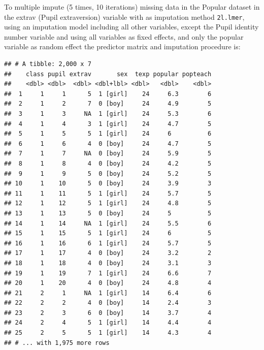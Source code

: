 \documentclass[
]{book}
\newenvironment{Shaded}{\begin{snugshade}}{\end{snugshade}}
\newcommand{\DataTypeTok}[1]{\textcolor[rgb]{0.13,0.29,0.53}{#1}}
\newcommand{\DecValTok}[1]{\textcolor[rgb]{0.00,0.00,0.81}{#1}}
\newcommand{\KeywordTok}[1]{\textcolor[rgb]{0.13,0.29,0.53}{\textbf{#1}}}
\newcommand{\NormalTok}[1]{#1}
\newcommand{\OperatorTok}[1]{\textcolor[rgb]{0.81,0.36,0.00}{\textbf{#1}}}
\newcommand{\StringTok}[1]{\textcolor[rgb]{0.31,0.60,0.02}{#1}}
\begin{document}
To multiple impute (5 times, 10 iterations) missing data in the Popular
dataset in the extrav (Pupil extraversion) variable with as imputation
method \texttt{2l.lmer}, using an imputation model including all other
variables, except the Pupil identity number variable and using all
variables as fixed effects, and only the popular variable as random
effect the predictor matrix and imputation procedure is:

\begin{Shaded}
\end{Shaded}

\begin{verbatim}
## # A tibble: 2,000 x 7
##    class pupil extrav       sex  texp popular popteach
##    <dbl> <dbl>  <dbl> <dbl+lbl> <dbl>   <dbl>    <dbl>
##  1     1     1      5  1 [girl]    24     6.3        6
##  2     1     2      7  0 [boy]     24     4.9        5
##  3     1     3     NA  1 [girl]    24     5.3        6
##  4     1     4      3  1 [girl]    24     4.7        5
##  5     1     5      5  1 [girl]    24     6          6
##  6     1     6      4  0 [boy]     24     4.7        5
##  7     1     7     NA  0 [boy]     24     5.9        5
##  8     1     8      4  0 [boy]     24     4.2        5
##  9     1     9      5  0 [boy]     24     5.2        5
## 10     1    10      5  0 [boy]     24     3.9        3
## 11     1    11      5  1 [girl]    24     5.7        5
## 12     1    12      5  1 [girl]    24     4.8        5
## 13     1    13      5  0 [boy]     24     5          5
## 14     1    14     NA  1 [girl]    24     5.5        6
## 15     1    15      5  1 [girl]    24     6          5
## 16     1    16      6  1 [girl]    24     5.7        5
## 17     1    17      4  0 [boy]     24     3.2        2
## 18     1    18      4  0 [boy]     24     3.1        3
## 19     1    19      7  1 [girl]    24     6.6        7
## 20     1    20      4  0 [boy]     24     4.8        4
## 21     2     1     NA  1 [girl]    14     6.4        6
## 22     2     2      4  0 [boy]     14     2.4        3
## 23     2     3      6  0 [boy]     14     3.7        4
## 24     2     4      5  1 [girl]    14     4.4        4
## 25     2     5      5  1 [girl]    14     4.3        4
## # ... with 1,975 more rows
\end{verbatim}
\end{document}

